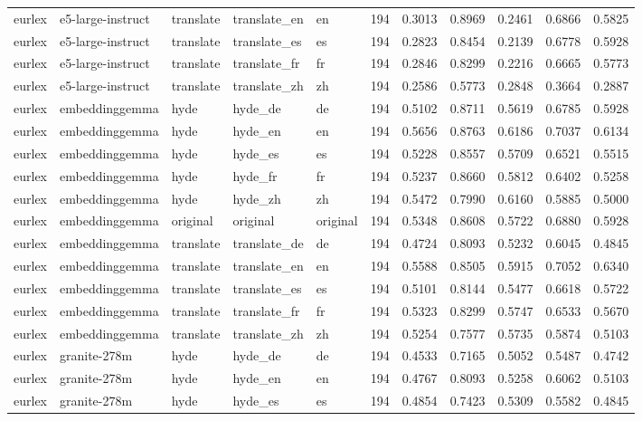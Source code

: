 \begin{tabular}{lllllrrrrrr}
eurlex & e5-large-instruct & translate & translate\_en & en & 194 & 0.3013 & 0.8969 & 0.2461 & 0.6866 & 0.5825 \\
eurlex & e5-large-instruct & translate & translate\_es & es & 194 & 0.2823 & 0.8454 & 0.2139 & 0.6778 & 0.5928 \\
eurlex & e5-large-instruct & translate & translate\_fr & fr & 194 & 0.2846 & 0.8299 & 0.2216 & 0.6665 & 0.5773 \\
eurlex & e5-large-instruct & translate & translate\_zh & zh & 194 & 0.2586 & 0.5773 & 0.2848 & 0.3664 & 0.2887 \\
eurlex & embeddinggemma & hyde & hyde\_de & de & 194 & 0.5102 & 0.8711 & 0.5619 & 0.6785 & 0.5928 \\
eurlex & embeddinggemma & hyde & hyde\_en & en & 194 & 0.5656 & 0.8763 & 0.6186 & 0.7037 & 0.6134 \\
eurlex & embeddinggemma & hyde & hyde\_es & es & 194 & 0.5228 & 0.8557 & 0.5709 & 0.6521 & 0.5515 \\
eurlex & embeddinggemma & hyde & hyde\_fr & fr & 194 & 0.5237 & 0.8660 & 0.5812 & 0.6402 & 0.5258 \\
eurlex & embeddinggemma & hyde & hyde\_zh & zh & 194 & 0.5472 & 0.7990 & 0.6160 & 0.5885 & 0.5000 \\
eurlex & embeddinggemma & original & original & original & 194 & 0.5348 & 0.8608 & 0.5722 & 0.6880 & 0.5928 \\
eurlex & embeddinggemma & translate & translate\_de & de & 194 & 0.4724 & 0.8093 & 0.5232 & 0.6045 & 0.4845 \\
eurlex & embeddinggemma & translate & translate\_en & en & 194 & 0.5588 & 0.8505 & 0.5915 & 0.7052 & 0.6340 \\
eurlex & embeddinggemma & translate & translate\_es & es & 194 & 0.5101 & 0.8144 & 0.5477 & 0.6618 & 0.5722 \\
eurlex & embeddinggemma & translate & translate\_fr & fr & 194 & 0.5323 & 0.8299 & 0.5747 & 0.6533 & 0.5670 \\
eurlex & embeddinggemma & translate & translate\_zh & zh & 194 & 0.5254 & 0.7577 & 0.5735 & 0.5874 & 0.5103 \\
eurlex & granite-278m & hyde & hyde\_de & de & 194 & 0.4533 & 0.7165 & 0.5052 & 0.5487 & 0.4742 \\
eurlex & granite-278m & hyde & hyde\_en & en & 194 & 0.4767 & 0.8093 & 0.5258 & 0.6062 & 0.5103 \\
eurlex & granite-278m & hyde & hyde\_es & es & 194 & 0.4854 & 0.7423 & 0.5309 & 0.5582 & 0.4845 \\

\end{tabular}
